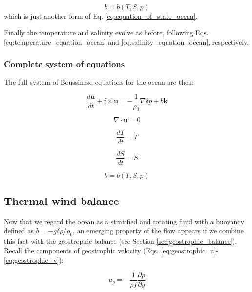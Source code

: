\documentclass[12pt]{article}
\numberwithin{equation}{section}
\numberwithin{figure}{section}
\numberwithin{table}{section}
\begin{document}
\begin{equation}
  b = b(T, S, p)
\end{equation}
which is just another form of Eq. \ref{eq:equation_of_state_ocean}.

Finally the temperature and salinity evolve as before, following
Eqs. \ref{eq:temperature_equation_ocean} and \ref{eq:salinity_equation_ocean},
respectively.

\subsubsection{Complete system of equations}

The full system of Boussinesq equations for the ocean are then:

\begin{equation}
  \frac{d \mathbf{u}}{dt} + \mathbf{f} \times \mathbf{u} =
  - \frac{1}{\rho_0} \nabla \delta p + b \mathbf{k}
\end{equation}

\begin{equation}
  \nabla \cdot \mathbf{u} = 0
\end{equation}

\begin{equation}
  \frac{d T}{dt} = \dot{T}
\end{equation}

\begin{equation}
  \frac{d S}{dt} = \dot{S}
\end{equation}

\begin{equation}
  b = b(T, S, p)
\end{equation}

\subsection{Thermal wind balance}

Now that we regard the ocean as a stratified and rotating fluid with a buoyancy
defined as $b = - g \delta \rho / \rho_0$, an emerging property of the flow
appears if we combine this fact with the geostrophic balance
(see Section \ref{sec:geostrophic_balance}).
Recall the components of geostrophic velocity (Eqs. \ref{eq:geostrophic_u}-\ref{eq:geostrophic_v}):

\begin{equation}
  u_g = - \frac{1}{\rho f} \frac{\partial p}{\partial y}
  \label{eq:geostrophic_u}
\end{equation}
\end{document}
